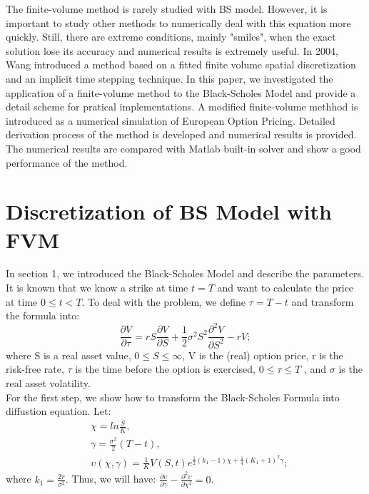 \documentclass[final]{siamltex}
\begin{document}
The finite-volume method is rarely studied with BS model. However, it is important to study other methods to numerically deal with this equation more quickly. Still, there are extreme conditions, mainly "smiles"\cite{JohnHull}, when the exact solution lose its accuracy and numerical results is extremely useful. In 2004, Wang\cite{wang2004FVM} introduced a method based on a fitted finite volume spatial discretization and an implicit time stepping technique. In this paper, we investigated the application of a finite-volume method to the Black-Scholes Model and provide a detail scheme for pratical implementations. A modified finite-volume methhod is introduced as a numerical simulation of European Option Pricing. Detailed derivation process of the method is developed and numerical results is provided. The numerical results are compared with Matlab built-in solver and show a good performance of the method.\\ 


\section{Discretization of BS Model with FVM}
In section 1, we introduced the Black-Scholes Model and describe the parameters. It is known that we know a strike at time $t=T$ and want to calculate the price at time $0 \leq t<T$. To deal with the problem, we define $\tau = T-t$ and transform the formula into:
\begin{equation}
\frac{\partial V}{\partial \tau}=rS \frac{\partial V}{\partial S}+\frac{1}{2} \sigma ^2 S^2 \frac{\partial ^2 V}{\partial S ^2}-rV;
\label{BS_Formula}
\end{equation}
where S is a real asset value, $0 \leq S \leq \infty$, V is the (real) option price, r is the risk-free rate, $\tau$ is the time before the option is
exercised, $0 \leq \tau \leq T$ , and $\sigma$ is the real asset volatility.  \\

For the first step, we show how to transform the Black-Scholes Formula into diffustion equation\cite{FEM1}. Let:
\begin{equation}
\begin{split}
&\chi=ln \frac{S}{K},\\
&\gamma = \frac{\sigma ^2}{2}(T-t),\\
&\upsilon(\chi,\gamma)=\frac{1}{K}V(S,t)e^{\frac{1}{2}(k_1-1)\chi+\frac{1}{4}(K_1+1)^2 \gamma};
\end{split}
\end{equation}
where $k_1=\frac{2r}{\sigma^2}$. Thus, we will have: $\frac{\partial \upsilon}{\partial \gamma}-\frac{\partial ^2 \upsilon}{\partial \chi ^2}=0$.
\end{document}
